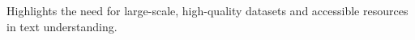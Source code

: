 Highlights the need for large-scale, high-quality datasets and accessible resources in text understanding.